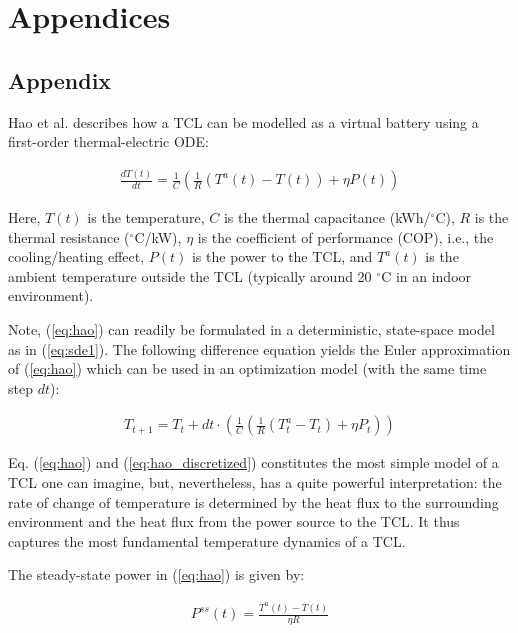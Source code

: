 \appendix
\section*{Appendices}
\renewcommand{\thesubsection}{\Alph{subsection}}
\subsection{Appendix}\label{appendix:A}

Hao et al. \cite{hao2014aggregate} describes how a TCL can be modelled as a virtual battery using a first-order thermal-electric ODE:

\begin{align}\label{eq:hao}
    \frac{dT(t)}{dt} = \frac{1}{C}\left( \frac{1}{R}(T^{a}(t) - T(t)) + \eta P(t) \right)
\end{align}

Here, $T(t)$ is the temperature, $C$ is the thermal capacitance (kWh/$^{\circ}$C), $R$ is the thermal resistance ($^{\circ}$C/kW), $\eta$ is the coefficient of performance (COP), i.e., the cooling/heating effect, $P(t)$ is the power to the TCL, and $T^{a}(t)$ is the ambient temperature outside the TCL (typically around 20 $^{\circ}$C in an indoor environment).

Note, (\ref{eq:hao}) can readily be formulated in a deterministic, state-space model as in (\ref{eq:sde1}). The following difference equation yields the Euler approximation of (\ref{eq:hao}) which can be used in an optimization model (with the same time step $dt$):

\begin{align}\label{eq:hao_discretized}
    T_{t+1} = T_t + dt\cdot \left( \frac{1}{C}\left( \frac{1}{R}(T^{a}_t - T_t) + \eta P_t \right)  \right)
\end{align}

Eq. (\ref{eq:hao}) and (\ref{eq:hao_discretized}) constitutes the most simple model of a TCL one can imagine, but, nevertheless, has a quite powerful interpretation: the rate of change of temperature is determined by the heat flux to the surrounding environment and the heat flux from the power source to the TCL. It thus captures the most fundamental temperature dynamics of a TCL.

The steady-state power in (\ref{eq:hao}) is given by:

\begin{align}\label{eq:hao_ss}
    P^{ss}(t) = \frac{T^{a}(t) - T(t)}{\eta R}
\end{align}

